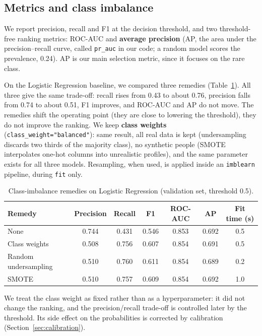 \documentclass[11pt,a4paper]{article}
\begin{document}
\subsection{Metrics and class imbalance}

We report precision, recall and F1 at the decision threshold, and two threshold-free ranking metrics: ROC-AUC and \textbf{average precision} (AP, the area under the precision--recall curve, called \texttt{pr\_auc} in our code; a random model scores the prevalence, 0.24). AP is our main selection metric, since it focuses on the rare class.

On the Logistic Regression baseline, we compared three remedies (Table~\ref{tab:imbalance}). All three give the same trade-off: recall rises from 0.43 to about 0.76, precision falls from 0.74 to about 0.51, F1 improves, and ROC-AUC and AP do not move. The remedies shift the operating point (they are close to lowering the threshold), they do not improve the ranking. We keep \textbf{class weights} (\texttt{class\_weight="balanced"}): same result, all real data is kept (undersampling discards two thirds of the majority class), no synthetic people (SMOTE interpolates one-hot columns into unrealistic profiles), and the same parameter exists for all three models. Resampling, when used, is applied inside an \texttt{imblearn} pipeline, during \texttt{fit} only.

\begin{table}[H]
\centering\small
\caption{Class-imbalance remedies on Logistic Regression (validation set, threshold 0.5).}
\label{tab:imbalance}
\begin{tabular}{lcccccc}
\toprule
\rowcolor{headblue}
Remedy & Precision & Recall & F1 & ROC-AUC & AP & Fit time (s) \\
\midrule
None & 0.744 & 0.431 & 0.546 & 0.853 & 0.692 & 0.5 \\
Class weights & 0.508 & 0.756 & 0.607 & 0.854 & 0.691 & 0.5 \\
Random undersampling & 0.510 & 0.760 & 0.611 & 0.854 & 0.689 & 0.2 \\
SMOTE & 0.510 & 0.757 & 0.609 & 0.854 & 0.692 & 1.0 \\
\bottomrule
\end{tabular}
\end{table}

\noindent We treat the class weight as fixed rather than as a hyperparameter: it did not change the ranking, and the precision/recall trade-off is controlled later by the threshold. Its side effect on the probabilities is corrected by calibration (Section~\ref{sec:calibration}).
\end{document}

